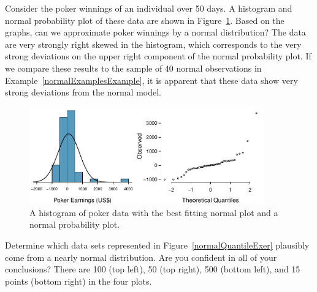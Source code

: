 \begin{examplewrap}
\begin{nexample}{Consider the poker winnings of an individual over 50 days.  A histogram and normal probability plot of these data are shown in Figure~\ref{pokerNormal}. Based on the graphs, can we approximate poker winnings by a normal distribution?} 
The data are very strongly right skewed in the histogram, which corresponds to the very strong deviations on the upper right component of the normal probability plot. If we compare these results to the sample of 40 normal observations in Example~\ref{normalExamplesExample}, it is apparent that these data show very strong deviations from the normal model.
\end{nexample}
\end{examplewrap}

\begin{figure}
\centering
\includegraphics[width=0.9\textwidth]{ch_distributions/figures/pokerNormal/pokerNormal}
\caption{A histogram of poker data with the best fitting normal plot and a normal probability plot.}
\label{pokerNormal}
\end{figure}

\D{\newpage}

\begin{exercisewrap}
\begin{nexercise}\label{normalQuantileExercise}%
Determine which data sets represented in Figure~\ref{normalQuantileExer} plausibly come from a nearly normal distribution. Are you confident in all of your conclusions? There are 100 (top left), 50 (top right), 500 (bottom left), and 15 points (bottom right) in the four plots.\footnotemark
\end{nexercise}
\end{exercisewrap}

